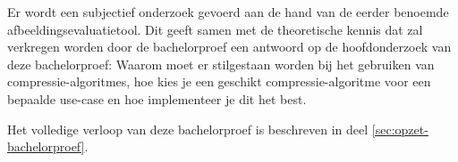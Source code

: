 Er wordt een subjectief onderzoek gevoerd aan de hand van de eerder benoemde \gls{afbeeldingsevaluatietool}. Dit geeft samen met de theoretische kennis dat zal verkregen worden door de bachelorproef een antwoord op de hoofdonderzoek van deze bachelorproef: Waarom moet er stilgestaan worden bij het gebruiken van \glspl{compressie-algoritme}, hoe kies je een geschikt \gls{compressie-algoritme} voor een bepaalde \gls{use-case} en hoe implementeer je dit het best.

Het volledige verloop van deze bachelorproef is beschreven in deel \ref{sec:opzet-bachelorproef}.